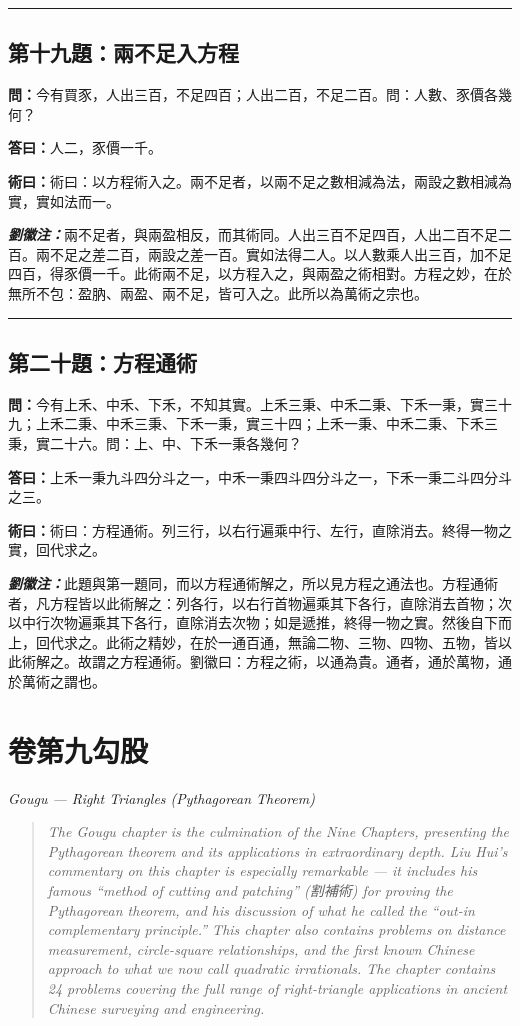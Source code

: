 \documentclass[11pt,a4paper]{article}
\newcommand{\volsubtitle}[1]{{\centering\Large\itshape\color{volcolor} #1\par\vspace{2em}}}
\newcommand{\wen}[1]{\textbf{\color{problemcolor}問：}#1\par}
\newcommand{\da}[1]{\textbf{答曰：}#1\par}
\newcommand{\shu}[1]{\textbf{術曰：}#1\par}
\newcommand{\liuhui}[1]{{\color{commentarycolor}\textit{\textbf{劉徽注：}}#1\par}}
\newcommand{\volheader}[2]{%
  \newpage
  \section*{#1\quad #2}
  \addcontentsline{toc}{section}{#1\quad #2}
  \markboth{#1\quad #2}{#1\quad #2}
  \vspace{1em}
}
\begin{document}
\bigskip
\hrule
\bigskip

\subsection{第十九題：兩不足入方程}

\wen{今有買豕，人出三百，不足四百；人出二百，不足二百。問：人數、豕價各幾何？}

\da{人二，豕價一千。}

\shu{術曰：以方程術入之。兩不足者，以兩不足之數相減為法，兩設之數相減為實，實如法而一。}

\liuhui{兩不足者，與兩盈相反，而其術同。人出三百不足四百，人出二百不足二百。兩不足之差二百，兩設之差一百。實如法得二人。以人數乘人出三百，加不足四百，得豕價一千。此術兩不足，以方程入之，與兩盈之術相對。方程之妙，在於無所不包：盈肭、兩盈、兩不足，皆可入之。此所以為萬術之宗也。}

\bigskip
\hrule
\bigskip

\subsection{第二十題：方程通術}

\wen{今有上禾、中禾、下禾，不知其實。上禾三秉、中禾二秉、下禾一秉，實三十九；上禾二秉、中禾三秉、下禾一秉，實三十四；上禾一秉、中禾二秉、下禾三秉，實二十六。問：上、中、下禾一秉各幾何？}

\da{上禾一秉九斗四分斗之一，中禾一秉四斗四分斗之一，下禾一秉二斗四分斗之三。}

\shu{術曰：方程通術。列三行，以右行遍乘中行、左行，直除消去。終得一物之實，回代求之。}

\liuhui{此題與第一題同，而以方程通術解之，所以見方程之通法也。方程通術者，凡方程皆以此術解之：列各行，以右行首物遍乘其下各行，直除消去首物；次以中行次物遍乘其下各行，直除消去次物；如是遞推，終得一物之實。然後自下而上，回代求之。此術之精妙，在於一通百通，無論二物、三物、四物、五物，皆以此術解之。故謂之方程通術。劉徽曰：方程之術，以通為貴。通者，通於萬物，通於萬術之謂也。}

\newpage
\volheader{卷第九}{勾股}

\volsubtitle{Gougu --- Right Triangles (Pythagorean Theorem)}

\begin{quote}
\color{quotecolor}
\textit{The Gougu chapter is the culmination of the Nine Chapters, presenting the Pythagorean theorem and its applications in extraordinary depth. Liu Hui's commentary on this chapter is especially remarkable --- it includes his famous ``method of cutting and patching'' (割補術) for proving the Pythagorean theorem, and his discussion of what he called the ``out-in complementary principle.'' This chapter also contains problems on distance measurement, circle-square relationships, and the first known Chinese approach to what we now call quadratic irrationals. The chapter contains 24 problems covering the full range of right-triangle applications in ancient Chinese surveying and engineering.}
\end{quote}
\end{document}
